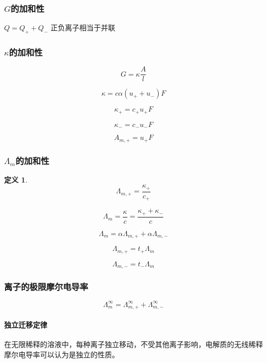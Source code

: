 \documentclass[a4paper]{ctexrep}
\newtheorem{definition}{定义}[chapter]
\begin{document}
        \subsubsection{$G$的加和性}

        $Q = Q_+ + Q_-$ 正负离子相当于并联

        \subsubsection{$\kappa$的加和性}

        \[
            G = \kappa \frac{A}{l}  
        \]

        \[
            \kappa = c\alpha(u_+ + u_-)F  
        \]

        \[
            \kappa_+ = c_+ u_+ F  
        \]

        \[
            \kappa_- = c_- u_- F  
        \]

        \begin{equation*}
            A_{m,+} = u_+ F
        \end{equation*}

        \subsubsection{$\varLambda_m$的加和性}

        \begin{definition}
            \[
                \varLambda_{m, +} = \frac{\kappa_+}{c_+}  
            \]
        \end{definition}

        \[
            \varLambda_m = \frac{\kappa}{c} = \frac{\kappa_+ + \kappa_-}{c}  
        \]

        \[
            \varLambda_m = \alpha \varLambda_{m, +} + \alpha \varLambda_{m, -}
        \]

        \[
            \varLambda_{m, +} = t_+ \varLambda_{m}  
        \]

        \[
            \varLambda_{m, -} = t_- \varLambda_{m}  
        \]

        \subsubsection{离子的极限摩尔电导率}

        \[
            \varLambda_m^\infty = \varLambda_{m, +}^\infty + \varLambda_{m, -}^\infty
        \]

        \paragraph{独立迁移定律} 在无限稀释的溶液中，每种离子独立移动，不受其他离子影响，电解质的无线稀释摩尔电导率可以认为是独立的性质。
\end{document}
